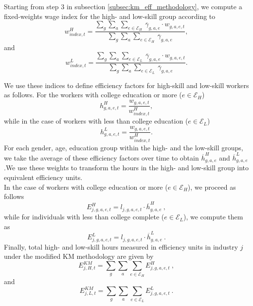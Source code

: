 \documentclass[10pt]{article}
\begin{document}
Starting from step 3 in subsection \ref{subsec:km_eff_methodology}, we compute a fixed-weights wage index for the high- and low-skill group according to 
\begin{equation*}
    w^{H}_{index,t} = \frac{\sum_{g}\sum_{a}\sum_{ e \in \mathcal{E} _{H} } \ \overline{\gamma}_{g,a,e} \cdot w_{g,a,e,t}}{\sum_{g}\sum_{a}\sum_{ e \in \mathcal{E} _{H} } \ \overline{\gamma}_{g,a,e}} ,
\end{equation*}
and
\begin{equation*}
    w^{L}_{index,t} = \frac{\sum_{g}\sum_{a}\sum_{ e \in \mathcal{E} _{L} } \ \overline{\gamma}_{g,a,e} \cdot w_{g,a,e,t}}{\sum_{g}\sum_{a}\sum_{ e \in \mathcal{E} _{L} } \ \overline{\gamma}_{g,a,e}} .
\end{equation*}

We use these indices to define efficiency factors for high-skill and low-skill workers as follows. For the workers with college education or more ($e \in \mathcal{E} _{H}$)
\begin{equation*}
h^{H}_{g,a,e,t}  = \frac{w_{g,a,e,t}}{w^{H}_{index,t}}, 
\end{equation*}
while in the case of workers with less than college education ($e \in \mathcal{E} _{L}$)
\begin{equation*}
h^{L}_{g,a,e,t}  = \frac{w_{g,a,e,t}}{w^{H}_{index,t}}. 
\end{equation*}
For each gender, age, education group within the high- and the low-skill groups, we take the average of these efficiency factors over time to obtain $\overline{h}^{H}_{g,a,e}$ and $\overline{h}^{L}_{g,a,e}$.We use these weights to transform the hours in the high- and low-skill group into equivalent efficiency units.\\

In the case of workers with college education or more ($e \in \mathcal{E} _{H}$), we proceed as follows
\begin{equation*}
E^{H}_{j,g,a,e,t} = l_{j,g,a,e,t} \cdot \overline{h}^{H}_{g,a,e} \ , 
\end{equation*}
while for individuals with less than college complete ($e \in \mathcal{E} _{L}$), we compute them as
\begin{equation*}
E^{L}_{j,g,a,e,t} = l_{j,g,a,e,t} \cdot \overline{h}^{L}_{g,a,e} \ . 
\end{equation*}
Finally, total high- and low-skill hours measured in efficiency units in industry $j$ under the modified KM methodology are given by
\begin{equation*}
E^{KM}_{j,H,t} = \sum_{g} \sum_{a} \sum_{ e \in \mathcal{E} _{H} } E^{H}_{j,g,a,e,t} \ ,
\end{equation*}
and
\begin{equation*}
E^{KM}_{j,L,t} = \sum_{g} \sum_{a} \sum_{ e \in \mathcal{E} _{L} } E^{L}_{j,g,a,e,t} \ .
\end{equation*}
\end{document}
